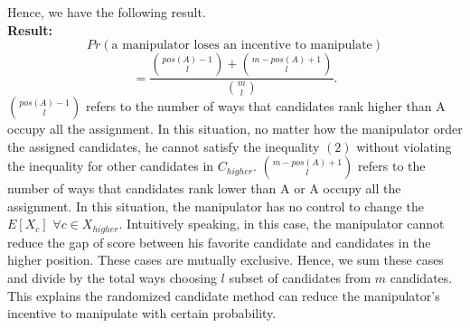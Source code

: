 \documentclass[letterpaper]{article} %
\begin{document}
Hence, we have the following result.\\
\textbf{Result:}
$$Pr(\text{a manipulator loses an incentive to manipulate})$$
\begin{equation}
 = \frac{\binom{pos(A)-1}{l}+\binom{m-pos(A)+1}{l}}{\binom{m}{l}}.
\end{equation}
$\binom{pos(A)-1}{l}$ refers to the number of ways that candidates rank higher than A occupy all the assignment. In this situation, no matter how the manipulator order the assigned candidates, he cannot satisfy the inequality $(2)$ without violating the inequality for other candidates in $C_{higher}$.
$\binom{m-pos(A)+1}{l}$ refers to the number of ways that candidates rank lower than A or A occupy all the assignment. In this situation, the manipulator has no control to change the $E[X_c]$ $\forall c \in X_{higher}$. Intuitively speaking, in this case, the manipulator cannot reduce the gap of score between his favorite candidate and candidates in the higher position. These cases are mutually exclusive. Hence, we sum these cases and divide by the total ways choosing $l$ subset of candidates from $m$ candidates. This explains the randomized candidate method can reduce the manipulator’s incentive to manipulate with certain probability. 
\end{document}
